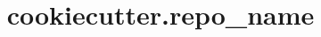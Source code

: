 \documentclass{beamer}
\title{
    {{ cookiecutter.repo_name }}
}
\begin{document}
\beginframes
\end{document}
